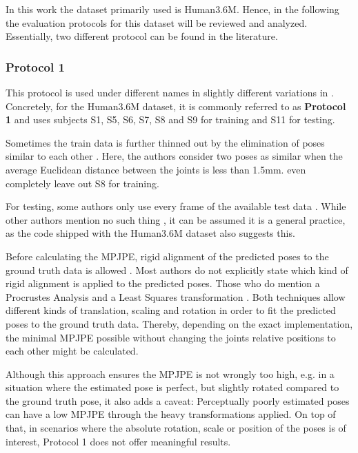 In this work the dataset primarily used is Human3.6M.
Hence, in the following the evaluation protocols for this dataset will be reviewed and analyzed.
Essentially, two different protocol can be found in the literature.

\subsubsection{Protocol 1}

This protocol is used under different names in slightly different variations in \cite{sun17, drover18, moreno-noguer16, yasin16, kostrikov14, tome17}.
Concretely, for the Human3.6M dataset, it is commonly referred to as \textbf{Protocol 1} and uses subjects S1, S5, S6, S7, S8 and S9 for training and S11 for testing.

Sometimes the train data is further thinned out by the elimination of poses similar to each other \cite{yasin16}.
Here, the authors consider two poses as similar when the average Euclidean distance between the joints is less than 1.5mm.
\citet{drover18} even completely leave out S8 for training.

For testing, some authors only use every  frame of the available test data \cite{sun17, chen17, yasin16, moreno-noguer16, tome17}.
While other authors mention no such thing \cite{drover18, kostrikov14}, it can be assumed it is a general practice, as the code shipped with the Human3.6M dataset also suggests this.

Before calculating the MPJPE, rigid alignment of the predicted poses to the ground truth data is allowed  \cite{drover18, yasin16, kostrikov14, sun17, tome17, chen17}.
Most authors do not explicitly state which kind of rigid alignment is applied to the predicted poses.
Those who do mention a Procrustes Analysis \cite{sun17, tome17} and a Least Squares transformation \cite{kostrikov14}.
Both techniques allow different kinds of translation, scaling and rotation in order to fit the predicted poses to the ground truth data.
Thereby, depending on the exact implementation, the minimal MPJPE possible without changing the joints relative positions to each other might be calculated.

Although this approach ensures the MPJPE is not wrongly too high, e.g. in a situation where the estimated pose is perfect, but slightly rotated compared to the ground truth pose, it also adds a caveat:
Perceptually poorly estimated poses can have a low MPJPE through the heavy transformations applied.
On top of that, in scenarios where the absolute rotation, scale or position of the poses is of interest, Protocol 1 does not offer meaningful results.


